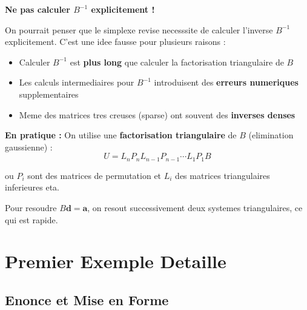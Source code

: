 \documentclass[12pt,a4paper]{article}
\begin{document}
\begin{notecours}
\textbf{Ne pas calculer $B^{-1}$ explicitement !}

On pourrait penser que le simplexe revise necesssite de calculer l'inverse $B^{-1}$ explicitement. C'est une idee fausse pour plusieurs raisons :

\begin{itemize}
    \item Calculer $B^{-1}$ est \textcolor{importantrouge}{\textbf{plus long}} que calculer la factorisation triangulaire de $B$
    \item Les calculs intermediaires pour $B^{-1}$ introduisent des \textcolor{importantrouge}{\textbf{erreurs numeriques}} supplementaires
    \item Meme des matrices tres creuses (sparse) ont souvent des \textcolor{importantrouge}{\textbf{inverses denses}}
\end{itemize}

\textbf{En pratique :} On utilise une \textcolor{defvert}{\textbf{factorisation triangulaire}} de $B$ (elimination gaussienne) :
$$U = L_n P_n L_{n-1} P_{n-1} \cdots L_1 P_1 B$$

ou $P_i$ sont des matrices de permutation et $L_i$ des matrices triangulaires inferieures eta.

Pour resoudre $B\mathbf{d} = \mathbf{a}$, on resout successivement deux systemes triangulaires, ce qui est rapide.
\end{notecours}

\newpage
\section{Premier Exemple Detaille}

\subsection{Enonce et Mise en Forme}
\end{document}
